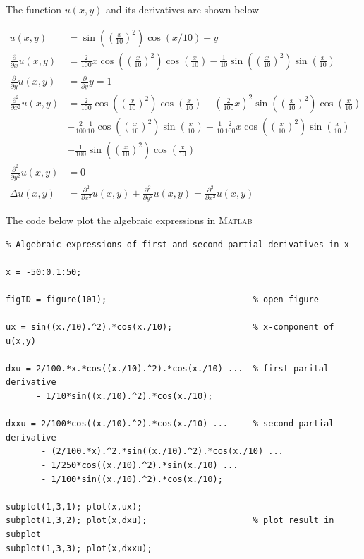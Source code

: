 \documentclass[paper=a4, fontsize=12pt]{article} %
\begin{document}
The function $u(x,y)$ and its derivatives are shown below

\begin{align*}
u(x,y) &= \sin\left(\left(\frac{x}{10}\right) ^2\right ) \cos(x/10)+y \\
\frac{\partial}{\partial x} u(x,y) &= \frac{2}{100}x\cos\left(\left(\frac{x}{10}\right) ^2\right )\cos\left(\frac{x}{10}\right )- \frac{1}{10}\sin\left(\left(\frac{x}{10}\right) ^2\right )\sin\left (\frac{x}{10}\right )\\
\frac{\partial}{\partial y} u(x,y) &= \frac{\partial}{\partial y}y = 1   \\
\frac{\partial^2}{\partial x^2} u(x,y) &= \frac{2}{100}\cos\left(\left(\frac{x}{10}\right) ^2\right )\cos\left(\frac{x}{10}\right ) - \left ( \frac{2}{100}x\right )^2 \sin \left(\left(\frac{x}{10}\right) ^2\right )\cos\left(\frac{x}{10}\right ) \\
 &- \frac{2}{100}\frac{1}{10}\cos\left(\left(\frac{x}{10}\right) ^2\right )\sin\left(\frac{x}{10}\right ) - \frac{1}{10}\frac{2}{100}x \cos\left(\left(\frac{x}{10}\right) ^2\right )\sin\left (\frac{x}{10}\right )\\
 & - \frac{1}{100}\sin\left(\left(\frac{x}{10}\right) ^2\right )\cos\left (\frac{x}{10}\right )\\
\frac{\partial^2}{\partial y^2} u(x,y) &= 0 \\
\Delta u(x,y) &= \frac{\partial^2}{\partial x^2} u(x,y) + \frac{\partial^2}{\partial y^2} u(x,y) =  \frac{\partial^2}{\partial x^2} u(x,y)
\end{align*}


The code below plot the algebraic expressions in \textsc{Matlab}

\begin{lstlisting}
% Algebraic expressions of first and second partial derivatives in x

x = -50:0.1:50;

figID = figure(101);                             % open figure

ux = sin((x./10).^2).*cos(x./10);                % x-component of u(x,y)

dxu = 2/100.*x.*cos((x./10).^2).*cos(x./10) ...  % first parital derivative
      - 1/10*sin((x./10).^2).*cos(x./10);

dxxu = 2/100*cos((x./10).^2).*cos(x./10) ...     % second partial derivative
       - (2/100.*x).^2.*sin((x./10).^2).*cos(x./10) ...
       - 1/250*cos((x./10).^2).*sin(x./10) ...
       - 1/100*sin((x./10).^2).*cos(x./10);
       
subplot(1,3,1); plot(x,ux);
subplot(1,3,2); plot(x,dxu);                     % plot result in subplot
subplot(1,3,3); plot(x,dxxu);

\end{lstlisting}
\end{document}
